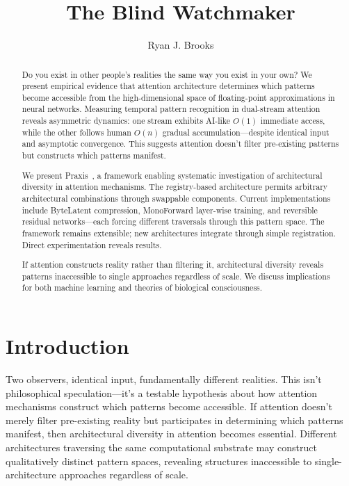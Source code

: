 \documentclass{article}
\begin{document}
\title{The Blind Watchmaker}
\author{Ryan J. Brooks}
\date{}

\maketitle

\begin{abstract}
    Do you exist in other people's realities the same way you exist in your own? We present empirical evidence that attention architecture determines which patterns become accessible from the high-dimensional space of floating-point approximations in neural networks. Measuring temporal pattern recognition in dual-stream attention reveals asymmetric dynamics: one stream exhibits AI-like $O(1)$ immediate access, while the other follows human $O(n)$ gradual accumulation—despite identical input and asymptotic convergence. This suggests attention doesn't filter pre-existing patterns but constructs which patterns manifest.

    We present Praxis~\cite{praxis2025}, a framework enabling systematic investigation of architectural diversity in attention mechanisms. The registry-based architecture permits arbitrary architectural combinations through swappable components. Current implementations include ByteLatent compression, MonoForward layer-wise training, and reversible residual networks—each forcing different traversals through this pattern space. The framework remains extensible; new architectures integrate through simple registration. Direct experimentation reveals results.

    If attention constructs reality rather than filtering it, architectural diversity reveals patterns inaccessible to single approaches regardless of scale. We discuss implications for both machine learning and theories of biological consciousness.
\end{abstract}

\section{Introduction}

Two observers, identical input, fundamentally different realities. This isn't philosophical speculation—it's a testable hypothesis about how attention mechanisms construct which patterns become accessible. If attention doesn't merely filter pre-existing reality but participates in determining which patterns manifest, then architectural diversity in attention becomes essential. Different architectures traversing the same computational substrate may construct qualitatively distinct pattern spaces, revealing structures inaccessible to single-architecture approaches regardless of scale.
\end{document}
